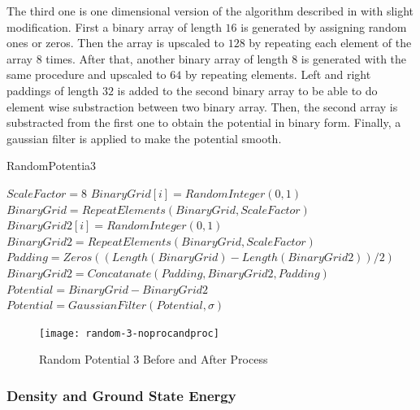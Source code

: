 \documentclass[a4paper,times,hidelinks,12pt]{article}
\begin{document}
The third one is one dimensional version of the algorithm described in \cite{mills2017deep} with slight modification. First a binary array of length $16$ is generated by assigning random ones or zeros. Then the array is upscaled to $128$ by repeating each element of the array $8$ times. After that, another binary array of length $8$ is generated with the same procedure and upscaled to $64$ by repeating elements. Left and right paddings of length $32$ is added to the second binary array to be able to do element wise substraction between two binary array. Then, the second array is substracted from the first one to obtain the potential in binary form. Finally, a gaussian filter is applied to make the potential smooth. 

\begin{algorithm}[H]
    \caption{RandomPotentia3}\label{euclid}
    \begin{algorithmic}[1]
        \State $ \textit{ScaleFactor} = 8$
        \State $BinaryGrid[i] = RandomInteger(0, 1)$
        \EndFor
        \State $BinaryGrid = RepeatElements(BinaryGrid, ScaleFactor)$
        \State $BinaryGrid2[i] = RandomInteger(0, 1)$
        \EndFor
        \State $BinaryGrid2 = RepeatElements(BinaryGrid, ScaleFactor)$
        \State $Padding = Zeros((Length(BinaryGrid) - Length(BinaryGrid2))/2)$
        \State $BinaryGrid2 = Concatanate(Padding, BinaryGrid2, Padding) $
        \State $Potential = BinaryGrid - BinaryGrid2$
        \State $Potential = GaussianFilter(Potential, \sigma)$ 
    \EndProcedure
    \end{algorithmic}
\label{alg:random_potential_1}
\end{algorithm}

\graphicspath{{"../figs/potentials/"}}
\begin{figure}[H]
    \centering
        \texttt{[image: random-3-noprocandproc]}
\caption{Random Potential 3 Before and After Process}
\label{fig:random3_before_after}
\end{figure}

\subsubsection{Density and Ground State Energy}
\end{document}
